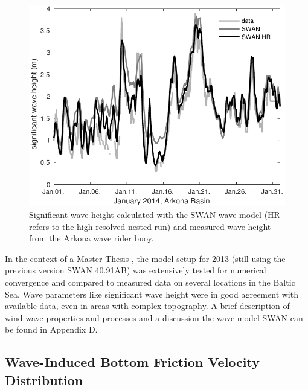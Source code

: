 \begin{figure}[ht]
 \includegraphics[width=15cm]{bilder/januar.pdf}
 \caption{Significant wave height calculated with the SWAN wave model (HR 
refers to the high resolved nested run) and measured wave height from the 
Arkona wave rider buoy.\label{verify}}
\end{figure}

In the context of a Master Thesis \citep[][]{masterarbeitronja}, the model 
setup for 2013 (still using the previous version SWAN 40.91AB) was 
extensively tested for numerical convergence and compared to measured data on 
several locations in the Baltic Sea. Wave parameters like significant wave 
height were in good agreement with available data, even in areas with complex 
topography. A brief description of wind wave properties and processes and a 
discussion the wave model SWAN can be found in Appendix D.

\subsection{Wave-Induced Bottom Friction Velocity Distribution}

